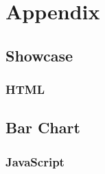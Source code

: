 \appendix
\chapter{Appendix}
\section{Showcase}
\subsection{HTML}

\section{Bar Chart}
\subsection{JavaScript}

